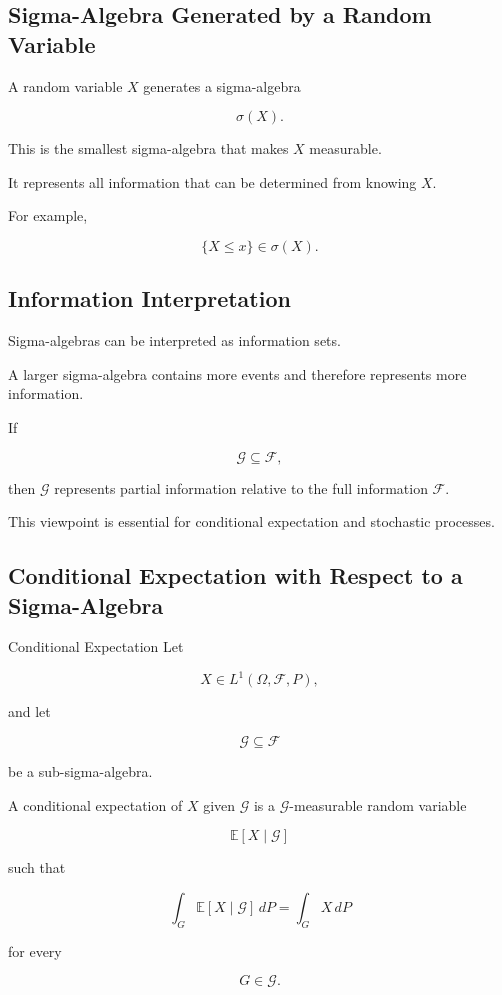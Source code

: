 \subsection{Sigma-Algebra Generated by a Random Variable}
\label{subsec:sigma-generated-rv}

A random variable \(X\) generates a sigma-algebra

\[
\boxed{
\sigma(X).
}
\]

This is the smallest sigma-algebra that makes \(X\) measurable.

It represents all information that can be determined from knowing \(X\).

For example,

\[
\{X\leq x\}
\in
\sigma(X).
\]

\subsection{Information Interpretation}
\label{subsec:sigma-algebra-information}

Sigma-algebras can be interpreted as information sets.

A larger sigma-algebra contains more events and therefore represents
more information.

If

\[
\mathcal{G}
\subseteq
\mathcal{F},
\]

then \(\mathcal{G}\) represents partial information relative to the full
information \(\mathcal{F}\).

This viewpoint is essential for conditional expectation and stochastic
processes.

\subsection{Conditional Expectation with Respect to a Sigma-Algebra}
\label{subsec:conditional-expectation-sigma}

\begin{definitionbox}{Conditional Expectation}
Let

\[
X\in L^1(\Omega,\mathcal{F},P),
\]

and let

\[
\mathcal{G}
\subseteq
\mathcal{F}
\]

be a sub-sigma-algebra.

A conditional expectation of \(X\) given \(\mathcal{G}\) is a
\(\mathcal{G}\)-measurable random variable

\[
\boxed{
\mathbb{E}[X\mid\mathcal{G}]
}
\]

such that

\[
\boxed{
\int_G
\mathbb{E}[X\mid\mathcal{G}]
\,dP
=
\int_G
X\,dP
}
\]

for every

\[
G\in\mathcal{G}.
\]
\end{definitionbox}

